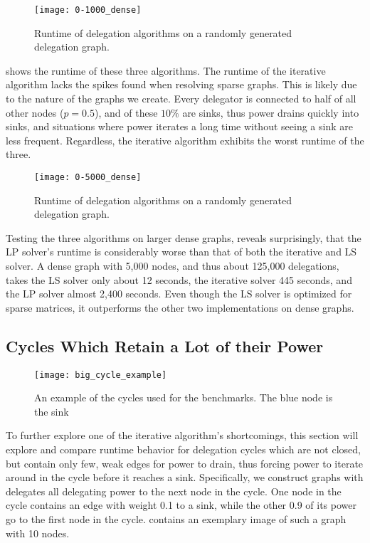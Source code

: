 \begin{figure}[t]
    \centering
    \texttt{[image: 0-1000\_dense]}
    \caption{Runtime of delegation algorithms on a randomly generated delegation graph.}
    \label{fig:dense-small}
\end{figure}

 shows the runtime of these three algorithms. The runtime of the iterative algorithm lacks the spikes found when resolving sparse graphs. This is likely due to the nature of the graphs we create. Every delegator is connected to half of all other nodes ($p = 0.5$), and of these $10\%$ are sinks, thus power drains quickly into sinks, and situations where power iterates a long time without seeing a sink are less frequent. Regardless, the iterative algorithm exhibits the worst runtime of the three. 

\begin{figure}[t]
    \centering
    \texttt{[image: 0-5000\_dense]}
    \caption{Runtime of delegation algorithms on a randomly generated delegation graph.}
    \label{fig:dense-large}
\end{figure}

Testing the three algorithms on larger dense graphs, reveals surprisingly, that the LP solver's runtime is considerably worse than that of both the iterative and LS solver. A dense graph with 5,000 nodes, and thus about 125,000 delegations, takes the LS solver only about 12 seconds, the iterative solver 445 seconds, and the LP solver almost 2,400 seconds. Even though the LS solver is optimized for sparse matrices, it outperforms the other two implementations on dense graphs.

\subsection{Cycles Which Retain a Lot of their Power}

\label{subsec:cycles_draining}

\begin{figure}[t]
	\centering
	\texttt{[image: big\_cycle\_example]}
	\caption{An example of the cycles used for the benchmarks. The blue node is the sink}
	\label{fig:big_cycle_example}
\end{figure}

To further explore one of the iterative algorithm's shortcomings, this section will explore and compare runtime behavior for delegation cycles which are not closed, but contain only few, weak edges for power to drain, thus forcing power to iterate around in the cycle before it reaches a sink. Specifically, we construct graphs with delegates all delegating power to the next node in the cycle. One node in the cycle contains an edge with weight 0.1 to a sink, while the other 0.9 of its power go to the first node in the cycle.  contains an exemplary image of such a graph with 10 nodes. 

